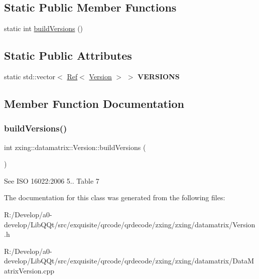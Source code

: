 \subsection*{Static Public Member Functions}
\begin{DoxyCompactItemize}
\item 
static int \mbox{\hyperlink{classzxing_1_1datamatrix_1_1_version_a5a3be281e793bb21a6ac105cfd54bdb5}{build\+Versions}} ()
\end{DoxyCompactItemize}
\subsection*{Static Public Attributes}
\begin{DoxyCompactItemize}
\item 
\mbox{\label{classzxing_1_1datamatrix_1_1_version_a1a409450e27135e2039d8dd82a93d72d}} 
static std\+::vector$<$ \mbox{\hyperlink{classzxing_1_1_ref}{Ref}}$<$ \mbox{\hyperlink{classzxing_1_1datamatrix_1_1_version}{Version}} $>$ $>$ {\bfseries V\+E\+R\+S\+I\+O\+NS}
\end{DoxyCompactItemize}


\subsection{Member Function Documentation}
\mbox{\label{classzxing_1_1datamatrix_1_1_version_a5a3be281e793bb21a6ac105cfd54bdb5}} 
\subsubsection{\texorpdfstring{build\+Versions()}{buildVersions()}}
{\footnotesize\ttfamily int zxing\+::datamatrix\+::\+Version\+::build\+Versions (\begin{DoxyParamCaption}{ }\end{DoxyParamCaption})\hspace{0.3cm}{\ttfamily [static]}}

See I\+SO 16022\+:2006 5.. Table 7 

The documentation for this class was generated from the following files\+:\begin{DoxyCompactItemize}
\item 
R\+:/\+Develop/a0-\/develop/\+Lib\+Q\+Qt/src/exquisite/qrcode/qrdecode/zxing/zxing/datamatrix/Version.\+h\item 
R\+:/\+Develop/a0-\/develop/\+Lib\+Q\+Qt/src/exquisite/qrcode/qrdecode/zxing/zxing/datamatrix/Data\+Matrix\+Version.\+cpp\end{DoxyCompactItemize}
